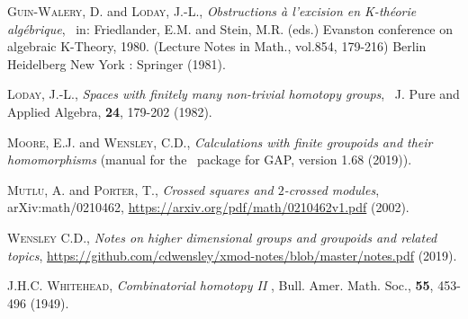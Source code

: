 \documentclass[a4paper,11pt]{article}
\theoremstyle{plain}
\theoremstyle{definition}
\begin{document}
\begin{thebibliography}{99}
	 \textsc{Guin-Walery, D.} and \textsc{Loday, J.-L.}, 
	\emph{Obstructions \`a l'excision en K-th\'eorie alg\'ebrique}, \ 
	in: Friedlander, E.M. and Stein, M.R. (eds.) 
	Evanston conference on algebraic K-Theory, 1980.  
	(Lecture Notes in Math., vol.854, 179-216) 
	Berlin Heidelberg New York : Springer (1981).
	
	 \textsc{Loday, J.-L.}, 
	\emph{Spaces with finitely many non-trivial homotopy groups}, \ 
	J. Pure and Applied Algebra, \textbf{24}, 179-202 (1982).
	
	
	 \textsc{Moore, E.J.} and \textsc{Wensley, C.D.}, 
	\emph{Calculations with finite groupoids and their homomorphisms}  
	{(manual for the \groupoids\ package for \textsf{GAP}, version 1.68   
	(2019))}. 

	
	 \textsc{Mutlu, A.} and \textsc{Porter, T.}, 
	\emph{Crossed squares and $2$-crossed modules}, 
	arXiv:math/0210462, \url{https://arxiv.org/pdf/math/0210462v1.pdf} (2002).
	
	
	
	 \textsc{Wensley C.D.},  
	\emph{Notes on higher dimensional groups and groupoids and related topics}, 
	\url{https://github.com/cdwensley/xmod-notes/blob/master/notes.pdf}
	(2019).
	
	 \textsc{J.H.C. Whitehead}, 
	\emph{Combinatorial homotopy II }, 
	Bull. Amer. Math. Soc., \textbf{55}, 453-496 (1949).
	
\end{thebibliography}
\end{document}
